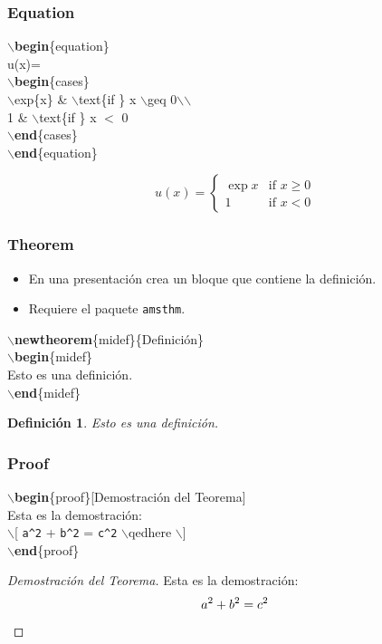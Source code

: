 \documentclass[aspectratio=43]{beamer}%
\begin{document}
\begin{frame}[fragile]
\frametitle{\textbf{Equation}}
\justifying
 \begin{block}{}
$\backslash$\textbf{begin}\{equation\}\\
u(x)=\\
$\backslash$\textbf{begin}\{cases\}\\
$\backslash$exp\{x\}    \& $\backslash$text\{if \} x $\backslash$geq 0$\backslash$$\backslash$\\
 1 \& $\backslash$text\{if \} x $<$ 0\\
 $\backslash$\textbf{end}\{cases\}\\
$\backslash$\textbf{end}\{equation\}

\end{block}
\begin{equation}
u(x)=
\begin{cases}
\exp{x}    & \text{if } x \geq 0\\
 1 & \text{if } x < 0
 \end{cases}
\end{equation}
\end{frame}

\begin{frame}[fragile]
\frametitle{\textbf{Theorem}}
\justifying
 \begin{itemize}\justifying
  \item En una presentación crea un bloque que contiene la definición.
  \item Requiere el paquete \texttt{amsthm}.
\end{itemize}

\begin{block}{}
$\backslash$\textbf{newtheorem}\{midef\}\{Definición\}\\
$\backslash$\textbf{begin}\{midef\}\\
Esto es una definición.    \\
$\backslash$\textbf{end}\{midef\}
\end{block}

\newtheorem{midef}{Definición}
\begin{midef}
Esto es una definición.    
\end{midef}
\end{frame}

\begin{frame}[fragile]
\frametitle{\textbf{Proof}}
\justifying
 \begin{block}{}
$\backslash$\textbf{begin}\{proof\}[Demostración del Teorema]\\
    Esta es la demostración:\\
    $\backslash$[ \verb+a^2+ + \verb+b^2+ = \verb+c^2+ $\backslash$qedhere $\backslash$]\\
$\backslash$\textbf{end}\{proof\}
\end{block}
\begin{proof}[Demostración del Teorema]
    Esta es la demostración:
    \[ a^2 + b^2 = c^2 \qedhere \]
\end{proof}
\end{frame}
\end{document}
